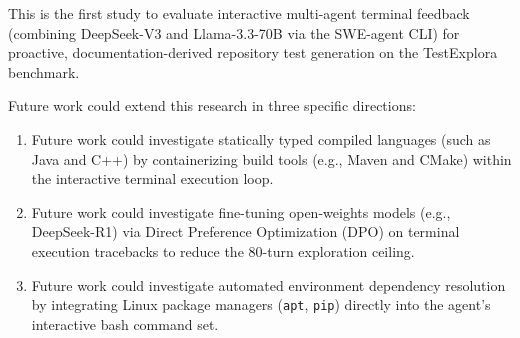 \documentclass[conference]{IEEEtran}
\begin{document}
This is the first study to evaluate interactive multi-agent terminal feedback (combining DeepSeek-V3 and Llama-3.3-70B via the SWE-agent CLI) for proactive, documentation-derived repository test generation on the TestExplora benchmark.

Future work could extend this research in three specific directions:
\begin{enumerate}
    \item Future work could investigate statically typed compiled languages (such as Java and C++) by containerizing build tools (e.g., Maven and CMake) within the interactive terminal execution loop.
    \item Future work could investigate fine-tuning open-weights models (e.g., DeepSeek-R1) via Direct Preference Optimization (DPO) on terminal execution tracebacks to reduce the 80-turn exploration ceiling.
    \item Future work could investigate automated environment dependency resolution by integrating Linux package managers (\texttt{apt}, \texttt{pip}) directly into the agent's interactive bash command set.
\end{enumerate}



\end{document}
